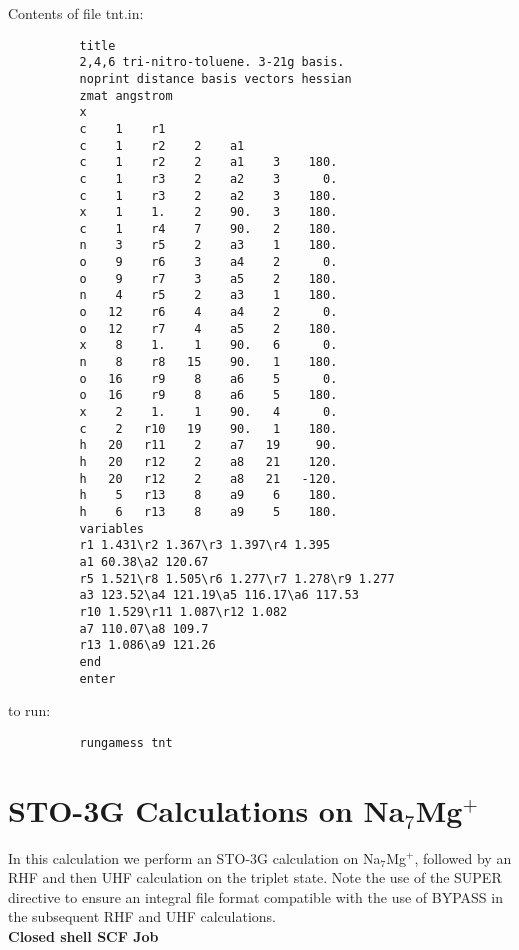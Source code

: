 \documentclass[11pt,fleqn]{article}
\newcommand{\namgplus}{\mbox{Na$_{7}$Mg$^{+}$}}
\begin{document}
Contents of file tnt.in:
{
\footnotesize
\begin{verbatim}
          title
          2,4,6 tri-nitro-toluene. 3-21g basis.
          noprint distance basis vectors hessian
          zmat angstrom
          x
          c    1    r1
          c    1    r2    2    a1
          c    1    r2    2    a1    3    180.
          c    1    r3    2    a2    3      0.
          c    1    r3    2    a2    3    180.
          x    1    1.    2    90.   3    180.
          c    1    r4    7    90.   2    180.
          n    3    r5    2    a3    1    180.
          o    9    r6    3    a4    2      0.
          o    9    r7    3    a5    2    180.
          n    4    r5    2    a3    1    180.
          o   12    r6    4    a4    2      0.
          o   12    r7    4    a5    2    180.
          x    8    1.    1    90.   6      0.
          n    8    r8   15    90.   1    180.
          o   16    r9    8    a6    5      0.
          o   16    r9    8    a6    5    180.
          x    2    1.    1    90.   4      0.
          c    2   r10   19    90.   1    180.
          h   20   r11    2    a7   19     90.
          h   20   r12    2    a8   21    120.
          h   20   r12    2    a8   21   -120.
          h    5   r13    8    a9    6    180.
          h    6   r13    8    a9    5    180.
          variables
          r1 1.431\r2 1.367\r3 1.397\r4 1.395
          a1 60.38\a2 120.67
          r5 1.521\r8 1.505\r6 1.277\r7 1.278\r9 1.277
          a3 123.52\a4 121.19\a5 116.17\a6 117.53
          r10 1.529\r11 1.087\r12 1.082
          a7 110.07\a8 109.7
          r13 1.086\a9 121.26
          end
          enter
\end{verbatim}
}
to run:
{
\footnotesize
\begin{verbatim}
          rungamess tnt
\end{verbatim}
}

\section[STO-3G Calculations on \namgplus]{STO-3G Calculations on \namgplus}
In this calculation we perform an STO-3G calculation on \namgplus,
followed by an RHF and then
UHF calculation on the triplet state. Note the use of the SUPER
directive to ensure an integral file format compatible with the
use of BYPASS in the subsequent RHF and UHF calculations.\\

{\bf Closed shell SCF Job}\\
\end{document}
